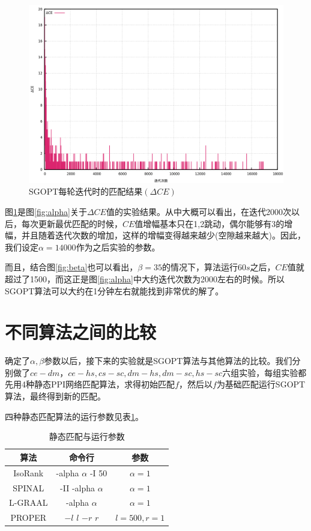 \begin{figure}[htbp]
\centering
\includegraphics[height=0.4\textheight]{pic/alpha_d.png}
\caption{SGOPT每轮迭代时的匹配结果$(\Delta CE)$} 
\label{fig:alpha_d}
\end{figure}

图\ref{fig:alpha_d}是图\ref{fig:alpha}关于$\Delta CE$值的实验结果。从中大概可以看出，在迭代2000次以后，每次更新最优匹配的时候，$CE$值增幅基本只在1,2跳动，偶尔能够有3的增幅，并且随着迭代次数的增加，这样的增幅变得越来越少(空隙越来越大)。因此，我们设定$\alpha=14000$作为之后实验的参数。

而且，结合图\ref{fig:beta}也可以看出，$\beta=35$的情况下，算法运行$60s$之后，$CE$值就超过了1500，而这正是图\ref{fig:alpha}中大约迭代次数为2000左右的时候。所以SGOPT算法可以大约在1分钟左右就能找到非常优的解了。

\section{不同算法之间的比较}

确定了$\alpha,\beta$参数以后，接下来的实验就是SGOPT算法与其他算法的比较。我们分别做了$ce-dm，ce-hs,cs-sc,dm-hs,dm-sc,hs-sc$六组实验，每组实验都先用4种静态PPI网络匹配算法，求得初始匹配$f$，然后以$f$为基础匹配运行SGOPT算法，最终得到新的匹配。

四种静态匹配算法的运行参数见表\ref{table:3}。

\begin{table}[htbp]
    \centering
    \caption{静态匹配与运行参数}
    \label{table:3}
    \begin{tabular}{ccc}
         \hline 算法&命令行&参数\\
         \hline IsoRank&-alpha $\alpha$ -I 50&$\alpha=1$\\
         SPINAL&-II -alpha $\alpha$&$\alpha=1$\\
         L-GRAAL&-alpha $\alpha$&$\alpha=1$\\
         PROPER&$-l$ $l$ $-r$ $r$&$l=500,r=1$\\
         \hline
    \end{tabular}
\end{table}

